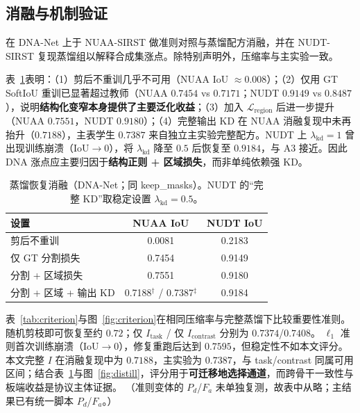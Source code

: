 \documentclass[lettersize,journal]{IEEEtran}
\begin{document}
\subsection{消融与机制验证}
\label{sec:ablation}

在 DNA-Net 上于 NUAA-SIRST 做准则对照与蒸馏配方消融，并在 NUDT-SIRST 复现蒸馏组以解释合成集涨点。除特别声明外，压缩率与主实验一致。

表~\ref{tab:distill}表明：（1）剪后不重训几乎不可用（NUAA IoU $\approx 0.008$）；（2）仅用 GT SoftIoU 重训已显著超过教师（NUAA $0.7454$ vs $0.7171$；NUDT $0.9149$ vs $0.8487$），说明\textbf{结构化变窄本身提供了主要泛化收益}；（3）加入 $\mathcal{L}_{\mathrm{region}}$ 后进一步提升（NUAA $0.7551$，NUDT $0.9180$）；（4）完整输出 KD 在 NUAA 消融复现中未再抬升（$0.7188$），主表学生 $0.7387$ 来自独立主实验完整配方。NUDT 上 $\lambda_{\mathrm{kd}}=1$ 曾出现训练崩溃（IoU$\to 0$），将 $\lambda_{\mathrm{kd}}$ 降至 $0.5$ 后恢复至 $0.9184$，与 A3 接近。因此 DNA 涨点应主要归因于\textbf{结构正则 + 区域损失}，而非单纯依赖强 KD。

\begin{table}[!t]
\caption{蒸馏恢复消融（DNA-Net；同 keep\_masks）。NUDT 的“完整 KD”取稳定设置 $\lambda_{\mathrm{kd}}=0.5$。}
\label{tab:distill}
\centering
\footnotesize
\begin{tabular}{|l|c|c|}
\hline
设置 & NUAA IoU & NUDT IoU \\
\hline
剪后不重训 & 0.0081 & 0.2183 \\
\hline
仅 GT 分割损失 & 0.7454 & 0.9149 \\
\hline
分割 + 区域损失 & 0.7551 & 0.9180 \\
\hline
分割 + 区域 + 输出 KD & 0.7188$^{\dagger}$ / 0.7387$^{\ddagger}$ & 0.9184 \\
\hline
\end{tabular}
\end{table}

表~\ref{tab:criterion}与图~\ref{fig:criterion}在相同压缩率与完整蒸馏下比较重要性准则。随机剪枝即可恢复至约 $0.72$；仅 $I_{\mathrm{task}}$ / 仅 $I_{\mathrm{contrast}}$ 分别为 $0.7374$/$0.7408$。
$\ell_1$ 准则首次训练崩溃（IoU$\to 0$），修复重跑后达到 $0.7595$，但稳定性不如本文评分。
本文完整 $I$ 在消融复现中为 $0.7188$，主实验为 $0.7387$，与 task/contrast 同属可用区间；结合表~\ref{tab:distill}与图~\ref{fig:distill}，评分用于\textbf{可迁移地选择通道}，而跨骨干一致性与板端收益是协议主体证据。
（准则变体的 $P_d$/$F_a$ 未单独复测，故表中从略；主结果已有统一脚本 $P_d$/$F_a$。）
\end{document}

